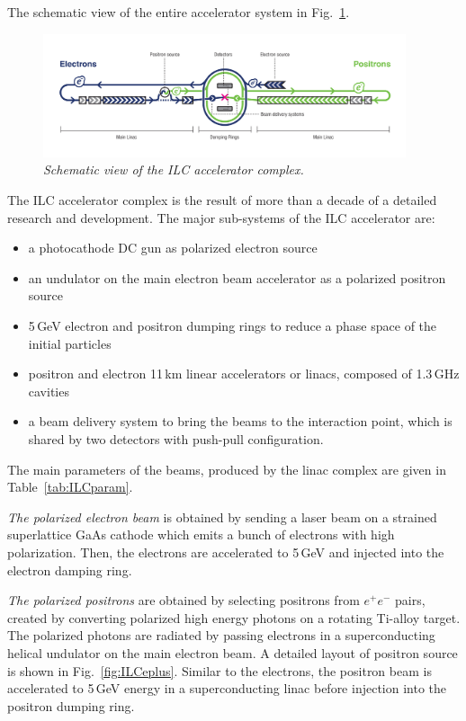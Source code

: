 The schematic view of the entire accelerator system in  Fig.~\ref{fig:ILCScheme}. 
\begin{figure}
{\centering
    \includegraphics[width=0.95\textwidth]{graphics/ILC_scheme.jpg}
    \caption{\sl Schematic view of the ILC accelerator complex.}
    \label{fig:ILCScheme}
  }
\end{figure}
The ILC accelerator complex is the result of more than a decade of a detailed research and development. 
The major sub-systems of the ILC accelerator are:
\begin{itemize}
\item a photocathode DC gun as polarized electron source
\item an undulator on the main electron beam accelerator as a polarized positron source
\item 5\,GeV electron and positron dumping rings to reduce a phase space of the initial particles
\item positron and electron 11\,km linear accelerators or linacs, composed of 1.3\,GHz cavities
\item a beam delivery system to bring the beams to the interaction point, which is shared by two detectors with push-pull configuration.
\end{itemize}
The main parameters of the beams, produced by the linac complex are given in Table~\ref{tab:ILCparam}.

\textit{The polarized electron beam} is obtained by sending a laser beam on a strained superlattice GaAs cathode which emits a bunch of electrons with high polarization. Then, the electrons are accelerated to 5\,GeV and injected into the electron damping ring.

\textit{The polarized positrons} are obtained by selecting positrons from $e^+ e^-$ pairs, created by converting polarized high energy photons on a rotating Ti-alloy target. The polarized photons are radiated by passing electrons in a superconducting helical undulator on the main electron beam.
A detailed layout of positron source is shown in Fig.~\ref{fig:ILCeplus}.
Similar to the electrons, the positron beam is accelerated to 5\,GeV energy in a superconducting linac before injection into the positron dumping ring. 

